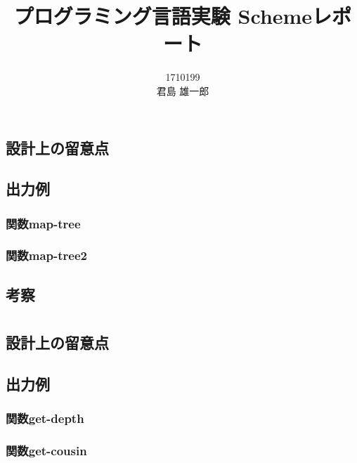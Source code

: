 \documentclass[12pt,a4j,dvipdfmx]{jarticle}
\begin{document}
\title{プログラミング言語実験  Schemeレポート\\} 
\author{1710199\\ 君島 雄一郎}
\date{}

\maketitle
\thispagestyle{empty}

\newpage
\section{}%
\subsection{設計上の留意点}

\subsection{出力例}
\subsubsection{関数map-tree}%
\subsubsection{関数map-tree2}%


\subsection{考察}


\newpage
\section{}%
\subsection{設計上の留意点}


\subsection{出力例}
\subsubsection{関数get-depth}%
\subsubsection{関数get-cousin}%
\end{document}
